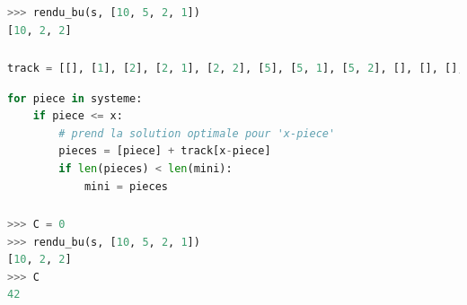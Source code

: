 \documentclass[svgnames,11pt]{beamer}
\begin{document}
\begin{frame}[fragile]
    \frametitle{}

\begin{center}
\begin{lstlisting}[language=Python , basicstyle=\ttfamily\small, xleftmargin=2em, xrightmargin=2em]
>>> rendu_bu(s, [10, 5, 2, 1])
[10, 2, 2]
\end{lstlisting}
\label{CODE}
\end{center}

\end{frame}
\begin{frame}[fragile]
    \frametitle{}

\begin{center}
\begin{lstlisting}[language=Python , basicstyle=\ttfamily\small, xleftmargin=0.2em, xrightmargin=0em]
track = [[], [1], [2], [2, 1], [2, 2], [5], [5, 1], [5, 2], [], [], [], [], [], [], []]
\end{lstlisting}
\begin{lstlisting}[language=Python , basicstyle=\ttfamily\small, xleftmargin=0.2em, xrightmargin=0em]
for piece in systeme:
    if piece <= x:
        # prend la solution optimale pour 'x-piece'
        pieces = [piece] + track[x-piece]
        if len(pieces) < len(mini):
            mini = pieces
\end{lstlisting}
\end{center}

\end{frame}
\begin{frame}[fragile]
    \frametitle{}

\begin{center}
\begin{lstlisting}[language=Python , basicstyle=\ttfamily\small, xleftmargin=2em, xrightmargin=2em]
>>> C = 0
>>> rendu_bu(s, [10, 5, 2, 1])
[10, 2, 2]
>>> C
42
\end{lstlisting}
\label{CODE}
\end{center}

\end{frame}
\end{document}
